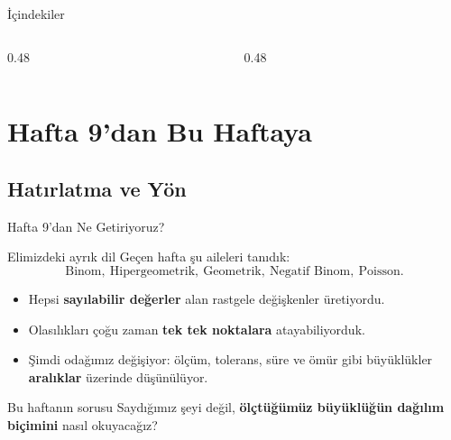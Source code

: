 \documentclass[light]{lutbeamer}
\begin{document}
\begin{frame}{İçindekiler}
  \scriptsize
  \begin{columns}[T]
    \begin{column}{0.48\textwidth}
      \tableofcontents[sections={1-3}]
    \end{column}
    \begin{column}{0.48\textwidth}
      \tableofcontents[sections={4-10}]
    \end{column}
  \end{columns}
\end{frame}

\section{Hafta 9'dan Bu Haftaya}
\subsection{Hatırlatma ve Yön}

\begin{frame}{Hafta 9'dan Ne Getiriyoruz?}
    \small
    \begin{block}{Elimizdeki ayrık dil}
        Geçen hafta şu aileleri tanıdık:
        \[
        \text{Binom},\ \text{Hipergeometrik},\ \text{Geometrik},\ \text{Negatif Binom},\ \text{Poisson}.
        \]
    \end{block}

    \begin{itemize}
        \item Hepsi \textbf{sayılabilir değerler} alan rastgele değişkenler üretiyordu.
        \item Olasılıkları çoğu zaman \textbf{tek tek noktalara} atayabiliyorduk.
        \item Şimdi odağımız değişiyor: ölçüm, tolerans, süre ve ömür gibi büyüklükler \textbf{aralıklar} üzerinde düşünülüyor.
    \end{itemize}

    \begin{alertblock}{Bu haftanın sorusu}
        Saydığımız şeyi değil, \textbf{ölçtüğümüz büyüklüğün dağılım biçimini} nasıl okuyacağız?
    \end{alertblock}
\end{frame}
\end{document}
